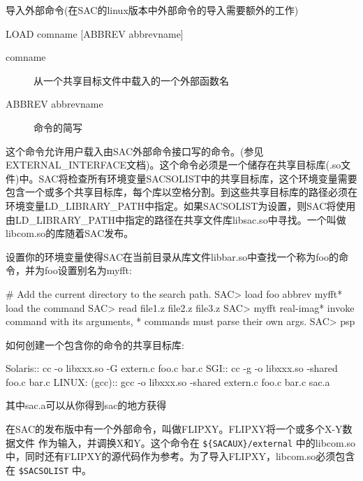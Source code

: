 \label{cmd:load}

导入外部命令(在SAC的linux版本中外部命令的导入需要额外的工作)

\begin{SACSTX}
LOAD comname [ABBREV abbrevname]
\end{SACSTX}

\begin{description}
\item [comname] 从一个共享目标文件中载入的一个外部函数名
\item [ABBREV abbrevname] 命令的简写
\end{description}

这个命令允许用户载入由SAC外部命令接口写的命令。(参见EXTERNAL\_INTERFACE文档)。这个命令必须是一个储存在共享目标库(.so文件)中。SAC将检查所有环境变量SACSOLIST中的共享目标库，这个环境变量需要包含一个或多个共享目标库，每个库以空格分割。到这些共享目标库的路径必须在环境变量LD\_LIBRARY\_PATH中指定。如果SACSOLIST为设置，则SAC将使用由LD\_LIBRARY\_PATH中指定的路径在共享文件库libsac.so中寻找。一个叫做libcom.so的库随着SAC发布。

设置你的环境变量使得SAC在当前目录从库文件libbar.so中查找一个称为foo的命令，并为foo设置别名为myfft:
\begin{SACCode}
#  Add the current directory to the search path.
SAC> load foo abbrev myfft* load the command
SAC> read file1.z file2.z file3.z
SAC> myfft real-imag* invoke command with its arguments,
* commands must parse their own args.
SAC> psp
\end{SACCode}

如何创建一个包含你的命令的共享目标库:
\begin{SACCode}
Solaris::
cc -o libxxx.so -G extern.c foo.c bar.c
SGI::
cc -g -o libxxx.so -shared foo.c bar.c
LINUX: (gcc)::
gcc -o libxxx.so -shared extern.c foo.c bar.c sac.a
\end{SACCode}
其中sac.a可以从你得到sac的地方获得

在SAC的发布版中有一个外部命令，叫做FLIPXY。FLIPXY将一个或多个X-Y数据文件
作为输入，并调换X和Y。这个命令在 \verb|${SACAUX}/external| 中的libcom.so
中，同时还有FLIPXY的源代码作为参考。为了导入FLIPXY，libcom.so必须包含在
\verb|$SACSOLIST| 中。
